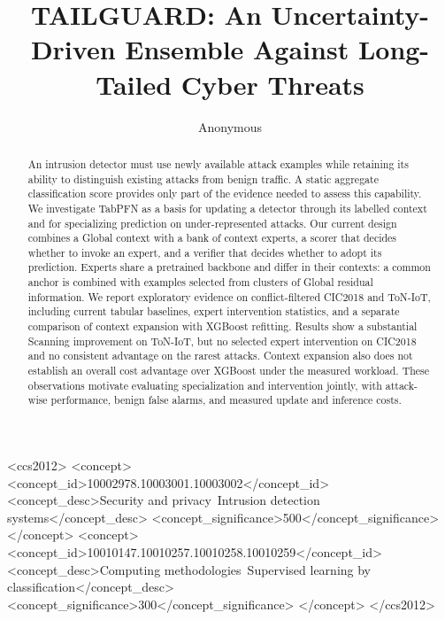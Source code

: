\documentclass[sigconf,anonymous,pbalance]{acmart}
\begin{document}
\title{TAILGUARD: An Uncertainty-Driven Ensemble
Against Long-Tailed Cyber Threats}
\author{Anonymous}

\begin{abstract}
An intrusion detector must use newly available attack examples while retaining its ability to distinguish existing attacks from benign traffic. A static aggregate classification score provides only part of the evidence needed to assess this capability. We investigate TabPFN as a basis for updating a detector through its labelled context and for specializing prediction on under-represented attacks. Our current design combines a Global context with a bank of context experts, a scorer that decides whether to invoke an expert, and a verifier that decides whether to adopt its prediction. Experts share a pretrained backbone and differ in their contexts: a common anchor is combined with examples selected from clusters of Global residual information. We report exploratory evidence on conflict-filtered CIC2018 and ToN-IoT, including current tabular baselines, expert intervention statistics, and a separate comparison of context expansion with XGBoost refitting. Results show a substantial Scanning improvement on ToN-IoT, but no selected expert intervention on CIC2018 and no consistent advantage on the rarest attacks. Context expansion also does not establish an overall cost advantage over XGBoost under the measured workload. These observations motivate evaluating specialization and intervention jointly, with attack-wise performance, benign false alarms, and measured update and inference costs.
\end{abstract}

\begin{CCSXML}
<ccs2012>
 <concept>
  <concept_id>10002978.10003001.10003002</concept_id>
  <concept_desc>Security and privacy~Intrusion detection systems</concept_desc>
  <concept_significance>500</concept_significance>
 </concept>
 <concept>
  <concept_id>10010147.10010257.10010258.10010259</concept_id>
  <concept_desc>Computing methodologies~Supervised learning by classification</concept_desc>
  <concept_significance>300</concept_significance>
 </concept>
</ccs2012>
\end{CCSXML}
\maketitle
\end{document}
